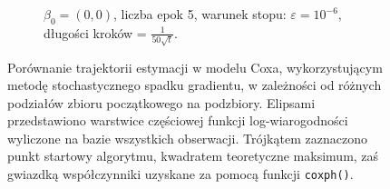 \begin{figure}[hbt!]
\begin{center}
\begin{subfigure}[h!]{0.9\textwidth}
            \caption{$\beta_0=(0,0)$, liczba epok 5, warunek stopu: $\varepsilon=10^{-6}$, długości kroków = $\frac{1}{50\sqrt{t}}$.}
   \end{subfigure}  
      \end{center}
  \caption[Porównanie trajektorii estymacji w modelu Coxa, wykorzystującym metodę stochastycznego spadku gradientu, przy różnych podziałach zbioru początkowego na podzbiory.]{\label{rysCox}Porównanie trajektorii estymacji w modelu Coxa, wykorzystującym metodę stochastycznego spadku gradientu, w zależności od różnych podziałów zbioru początkowego na podzbiory. Elipsami przedstawiono warstwice częściowej funkcji log-wiarogodności wyliczone na bazie wszystkich obserwacji. Trójkątem zaznaczono punkt startowy algorytmu, kwadratem teoretyczne maksimum, zaś gwiazdką współczynniki uzyskane za pomocą funkcji \texttt{coxph()}.}
\end{figure}



